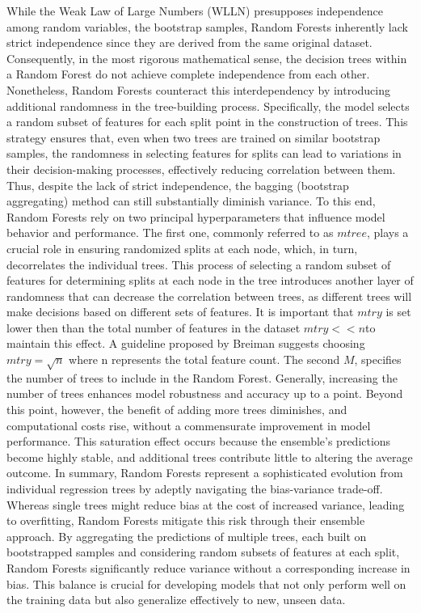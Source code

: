 \documentclass[12pt]{article}
\begin{document}
While the Weak Law of Large Numbers (WLLN) presupposes independence among random variables, the bootstrap samples, Random Forests inherently lack strict independence since they are derived from the same original dataset. 
Consequently, in the most rigorous mathematical sense, the decision trees within a Random Forest do not achieve complete independence from each other. Nonetheless, Random Forests counteract this interdependency by introducing additional randomness in the tree-building process. Specifically, the model selects a random subset of features for each split point in the construction of trees. This strategy ensures that, even when two trees are trained on similar bootstrap samples, the randomness in selecting features for splits can lead to variations in their decision-making processes, effectively reducing correlation between them. Thus, despite the lack of strict independence, the bagging (bootstrap aggregating) method can still substantially diminish variance.
To this end, Random Forests rely on two principal hyperparameters that influence model behavior and performance.
 The first one, commonly referred to as $mtree$, plays a crucial role in ensuring randomized splits at each node, which, in turn, decorrelates the individual trees. 
This process of selecting a random subset of features for determining splits at each node in the tree introduces another layer of randomness that can decrease the correlation between trees, as different trees will make decisions based on different sets of features.
It is important that $mtry$ is set lower then than the total number of features in the dataset $mtry<<n$to maintain this effect. A guideline proposed by Breiman suggests choosing $mtry=\sqrt{n}$ where n represents the total feature count.
The second $M$, specifies the number of trees to include in the Random Forest. Generally, increasing the number of trees enhances model robustness and accuracy up to a point. Beyond this point, however, the benefit of adding more trees diminishes, and computational costs rise, without a commensurate improvement in model performance. This saturation effect occurs because the ensemble's predictions become highly stable, and additional trees contribute little to altering the average outcome. 
In summary, Random Forests represent a sophisticated evolution from individual regression trees by adeptly navigating the bias-variance trade-off. Whereas single trees might reduce bias at the cost of increased variance, leading to overfitting, Random Forests mitigate this risk through their ensemble approach. 
 By aggregating the predictions of multiple trees, each built on bootstrapped samples and considering random subsets of features at each split, Random Forests significantly reduce variance without a corresponding increase in bias. This balance is crucial for developing models that not only perform well on the training data but also generalize effectively to new, unseen data.
\end{document}
